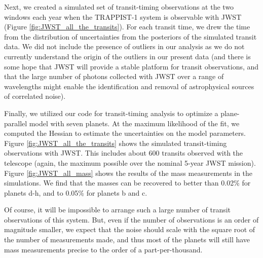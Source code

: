 \documentclass[twocolumn]{aastex63}
\begin{document}
Next, we created a simulated set of transit-timing observations at the two windows each year when the TRAPPIST-1 system is observable with JWST (Figure \ref{fig:JWST_all_the_transits}).   For each transit time, we drew the time from the distribution of uncertainties from the posteriors of the simulated transit data.  We did not include the presence of outliers in our analysis as we do not currently understand the origin of the outliers in our present data (and there is some hope that JWST will provide a stable platform for transit observations, and that the large number of photons collected with JWST over a range of wavelengths might enable the identification and removal of astrophysical sources of correlated noise).

Finally, we utilized our code for transit-timing analysis  to optimize a plane-parallel model with seven planets.  At the maximum likelihood of the fit, we computed the Hessian to estimate the uncertainties on the model parameters.  Figure \ref{fig:JWST_all_the_transits} shows the simulated transit-timing observations with JWST.   This includes about 600 transits observed with the telescope (again, the maximum possible over the nominal 5-year JWST mission).  Figure \ref{fig:JWST_all_mass} shows the results of the mass measurements in the simulations.  We find that the masses can be recovered to better than 0.02\% for planets d-h, and to 0.05\% for planets b and c.

Of course, it will be impossible to arrange such a large number of transit observations of this system.  But, even if the number of observations is an order of magnitude smaller, we expect that the noise should scale with the square root of the number of measurements made, and thus most of the planets will still have mass measurements precise to the order of a part-per-thousand.  
\end{document}
